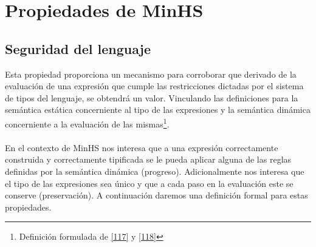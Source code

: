 \section{Propiedades de \textsf{MinHS}}

    \subsection{Seguridad del lenguaje}
        Esta propiedad  proporciona un mecanismo para corroborar que derivado de la evaluación de una expresión que cumple las restricciones dictadas por el sistema de tipos del lenguaje, se obtendrá un valor. Vinculando las definiciones para la semántica estática concerniente al tipo de las expresiones y la semántica dinámica concerniente a la evaluación de las mismas\footnote{Definición formulada de \hyperlink{117}{[117]} y \hyperlink{118}{[118]}}.\\\\
En el contexto de \textsf{MinHS} nos interesa que a  una expresión correctamente construida y correctamente tipificada se le pueda aplicar alguna de las reglas definidas por la semántica dinámica (progreso). Adicionalmente nos interesa que el tipo de las expresiones sea único y que a cada paso en la evaluación este se conserve (preservación). A continuación daremos una definición formal para estas propiedades.
        
